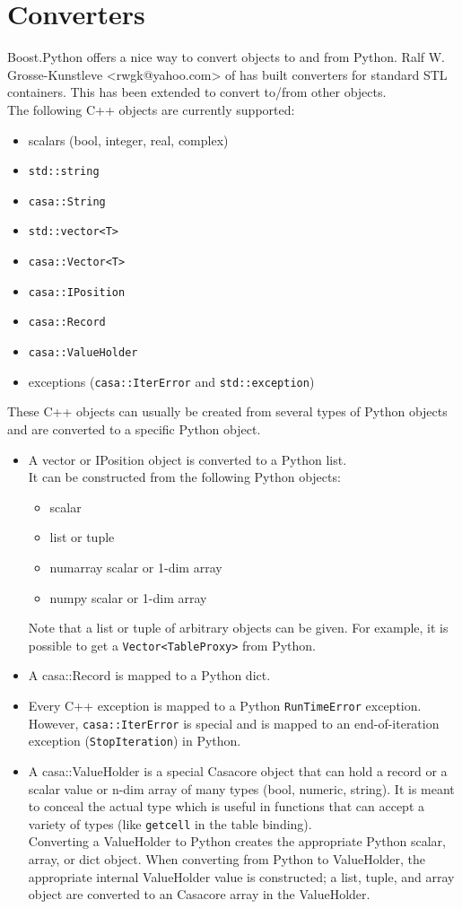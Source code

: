 \section{Converters}
Boost.Python offers a nice way to convert objects to and from Python.
Ralf W. Grosse-Kunstleve <rwgk@yahoo.com> of
has built converters for standard STL containers. This has been
extended to convert to/from other objects.
\\The following C++ objects are currently supported:
\begin{itemize}
  \item scalars (bool, integer, real, complex)
  \item \texttt{std::string}
  \item \texttt{casa::String}
  \item \texttt{std::vector<T>}
  \item \texttt{casa::Vector<T>}
  \item \texttt{casa::IPosition}
  \item \texttt{casa::Record}
  \item \texttt{casa::ValueHolder}
  \item exceptions (\texttt{casa::IterError} and \texttt{std::exception})
\end{itemize}
These C++ objects can usually be created from several types of Python
objects and are converted to a specific Python object.
\begin{itemize}
\item
A vector or IPosition object is converted to a Python list.
\\It can be constructed from the following Python objects:
\begin{itemize}
  \item scalar
  \item list or tuple
  \item numarray scalar or 1-dim array
  \item numpy scalar or 1-dim array
\end{itemize}
Note that a list or tuple of arbitrary objects can be given. For
example, it is possible to get a \texttt{Vector<TableProxy>} from Python.
\item
A casa::Record is mapped to a Python dict.
\item
Every C++ exception is mapped to a Python \texttt{RunTimeError}
exception. However, \texttt{casa::IterError} is special and 
is mapped to an end-of-iteration exception (\texttt{StopIteration}) in Python.
\item
A casa::ValueHolder is a special Casacore object that can hold a record or
a scalar value or n-dim array of many types (bool, numeric, string).
It is meant to conceal the actual type which is useful in functions
that can accept a variety of types (like \texttt{getcell}
in the table binding).
\\Converting a ValueHolder to Python creates the appropriate Python
scalar, array, or dict object. When converting from
Python to ValueHolder, the appropriate internal ValueHolder value
is constructed; a list, tuple, and array object are converted to an
Casacore array in the ValueHolder.
\end{itemize}
